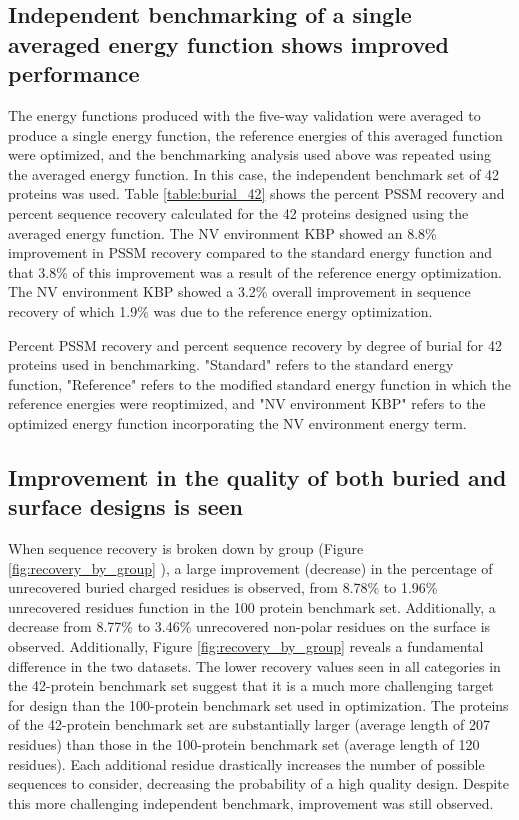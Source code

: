 \subsection{Independent benchmarking of a single averaged energy function shows improved performance}
The energy functions produced with the five-way validation were averaged to produce a single energy function, the reference energies of this averaged function were optimized, and the benchmarking analysis used above was repeated using the averaged energy function.
In this case, the independent benchmark set of 42 proteins was used.
Table \ref{table:burial_42} shows the percent \ac{PSSM} recovery and percent sequence recovery calculated for the 42 proteins designed using the averaged energy function.
The \ac{NV} environment \ac{KBP} showed an 8.8\% improvement in \ac{PSSM} recovery compared to the standard energy function and that 3.8\% of this improvement was a result of the reference energy optimization.
The \ac{NV} environment \ac{KBP} showed a 3.2\% overall improvement in sequence recovery of which 1.9\% was due to the reference energy optimization. 

\begin{table}
\scriptsize
\renewcommand{\tabcolsep}{0.09cm}
\centering

\caption{Percent \acs{PSSM} recovery and percent sequence recovery by degree of burial for 42 proteins used in benchmarking. 
"Standard" refers to the standard energy function, "Reference" refers to the modified standard energy function in which the reference energies were reoptimized, and "\acs{NV} environment \acs{KBP}" refers to the optimized energy function incorporating the NV environment energy term.}
\label{table:burial_42}
\end{table}

\subsection{Improvement in the quality of both buried and surface designs is seen}
When sequence recovery is broken down by group (Figure \ref{fig:recovery_by_group} ), a large improvement (decrease) in the percentage of unrecovered buried charged residues is observed, from 8.78\% to 1.96\% unrecovered residues function in the 100 protein benchmark set.
Additionally, a decrease from 8.77\% to 3.46\% unrecovered non-polar residues on the surface is observed.
Additionally, Figure \ref{fig:recovery_by_group} reveals a fundamental difference in the two datasets.
The lower recovery values seen in all categories in the 42-protein benchmark set suggest that it is a much more challenging target for design than the 100-protein benchmark set used in optimization.
The proteins of the 42-protein benchmark set are substantially larger (average length of 207 residues) than those in the 100-protein benchmark set (average length of 120 residues).
Each additional residue drastically increases the number of possible sequences to consider, decreasing the probability of a high quality design.
Despite this more challenging independent benchmark, improvement was still observed. 

